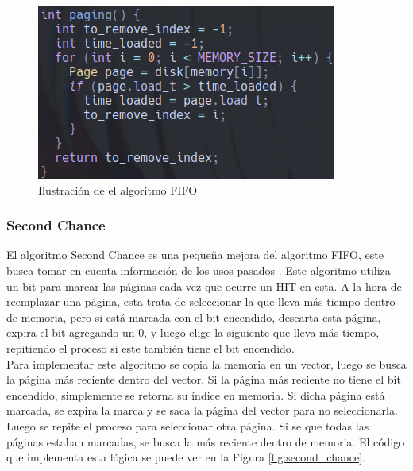 \documentclass{report}
\begin{document}
\begin{figure}[h]
  \centering
  \includegraphics[width=0.8\linewidth]{figuras/fifo.png}
  \caption{Ilustración de el algoritmo FIFO}
  \label{fig:fifo}
\end{figure}

\subsubsection{Second Chance}
El algoritmo Second Chance es una pequeña mejora del algoritmo FIFO, este busca tomar en cuenta información de los usos pasados \cite{ref1}. 
Este algoritmo utiliza un bit para marcar las páginas cada vez que ocurre un HIT en esta. 
A la hora de reemplazar una página, esta trata de seleccionar la que lleva más tiempo dentro de memoria, pero si está marcada con el bit encendido, descarta esta página, expira el bit agregando un 0, y luego elige la siguiente que lleva más tiempo, repitiendo el proceso si este también tiene el bit encendido. \\

Para implementar este algoritmo se copia la memoria en un vector, luego se busca la página más reciente dentro del vector. 
Si la página más reciente no tiene el bit encendido, simplemente se retorna su índice en memoria. 
Si dicha página está marcada, se expira la marca y se saca la página del vector para no seleccionarla.
Luego se repite el proceso para seleccionar otra página. 
Si se que todas las páginas estaban marcadas, se busca la más reciente dentro de memoria.
El código que implementa esta lógica se puede ver en la Figura \ref{fig:second_chance}.
\end{document}
